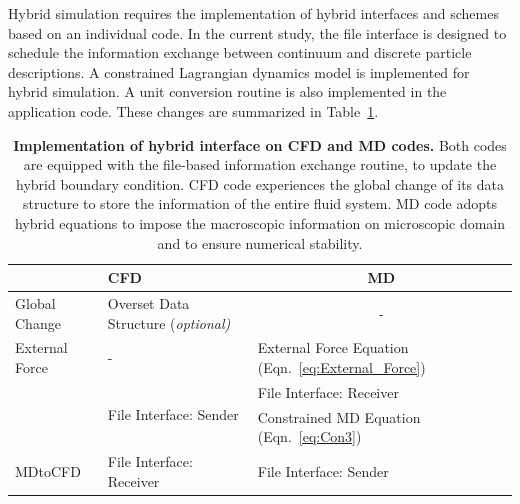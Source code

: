\documentclass[preprint,12pt]{elsarticle}
\begin{document}
Hybrid simulation requires the implementation of hybrid interfaces and schemes based on an individual code. In the current study, the file interface is designed to schedule the information exchange between continuum and discrete particle descriptions. A constrained Lagrangian dynamics model is implemented for hybrid simulation. A unit conversion routine is also implemented in the application code. These changes are summarized in Table~\ref{table:interface_implementation}. 


\begin{table}
  \caption{\small
{\bf Implementation of hybrid interface on CFD and MD codes.} Both codes are equipped with the file-based information exchange routine, to update the hybrid boundary condition. CFD code experiences the global change of its data structure to store the information of the entire fluid system. MD code adopts 
hybrid equations to impose the macroscopic information on microscopic domain and to ensure numerical stability. 
}
  \label{table:interface_implementation}
  \centering
\footnotesize
 \begin{tabular}{>{\centering}p{} || p{} | p{} }
\hline
  & \centering CFD & \multicolumn{1}{c}{MD} \\
\hline
 Global Change & Overset Data Structure (\it{optional}) & \multicolumn{1}{c}{-} \\
\hline
 \centering External Force & \centering - & External Force Equation (Eqn.~\ref{eq:External_Force}) \\
\hline
 \multirow{2}{*}{CFDtoMD} &  \multirow{2}{*}{File Interface: Sender} & {File Interface: Receiver} \\
 & & Constrained MD Equation (Eqn.~\ref{eq:Con3}) \\
\hline
 MDtoCFD & File Interface: Receiver & File Interface: Sender \\
\hline
\end{tabular} %
\vspace{-1em}
\end{table}


\end{document}
